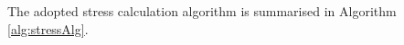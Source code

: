 \documentclass[sn-mathphys,Numbered,draft]{sn-jnl}%
\begin{document}

The adopted stress calculation algorithm \citep{de_souza_neto_computational_2008} is summarised in Algorithm \ref{alg:stressAlg}.
\end{document}

